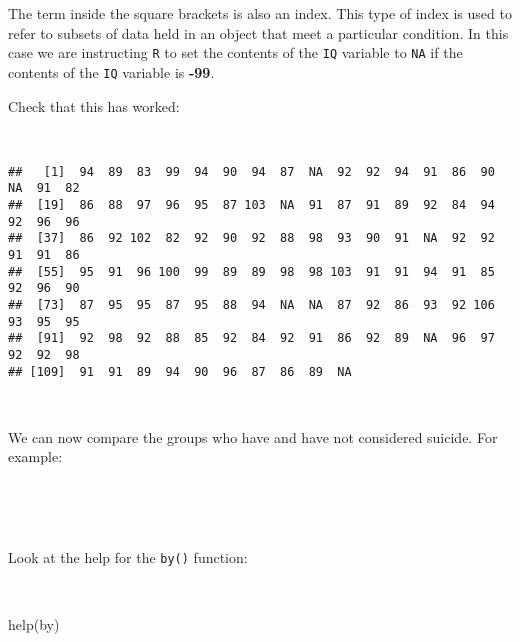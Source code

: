 \documentclass[
  12pt,
  a4paper]{book}
\newenvironment{Shaded}{\begin{snugshade}}{\end{snugshade}}
\newcommand{\FunctionTok}[1]{\textcolor[rgb]{0.00,0.00,0.00}{#1}}
\newcommand{\NormalTok}[1]{#1}
\newcommand{\SpecialCharTok}[1]{\textcolor[rgb]{0.00,0.00,0.00}{#1}}
\begin{document}
The term inside the square brackets is also an index. This type of index is used to refer to subsets of data held in an object that meet a particular condition. In this case we are instructing \texttt{R} to set the contents of the \texttt{IQ} variable to \texttt{NA} if the contents of the \texttt{IQ} variable is \textbf{-99}.

\newpage

Check that this has worked:

~

\begin{Shaded}
\end{Shaded}

\begin{verbatim}
##   [1]  94  89  83  99  94  90  94  87  NA  92  92  94  91  86  90  NA  91  82
##  [19]  86  88  97  96  95  87 103  NA  91  87  91  89  92  84  94  92  96  96
##  [37]  86  92 102  82  92  90  92  88  98  93  90  91  NA  92  92  91  91  86
##  [55]  95  91  96 100  99  89  89  98  98 103  91  91  94  91  85  92  96  90
##  [73]  87  95  95  87  95  88  94  NA  NA  87  92  86  93  92 106  93  95  95
##  [91]  92  98  92  88  85  92  84  92  91  86  92  89  NA  96  97  92  92  98
## [109]  91  91  89  94  90  96  87  86  89  NA
\end{verbatim}

~

We can now compare the groups who have and have not considered suicide. For example:

~

\begin{Shaded}
\end{Shaded}

~

Look at the help for the \texttt{by()} function:

~

\begin{Shaded}
\begin{Highlighting}[]
\FunctionTok{help}\NormalTok{(by)}
\end{Highlighting}
\end{Shaded}
\end{document}
